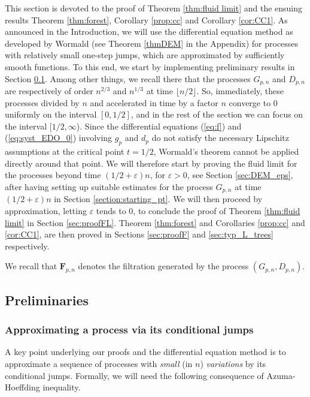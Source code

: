\documentclass[a4, 11pt]{article}
\numberwithin{equation}{section}
\theoremstyle{plain}
\theoremstyle{definition}
\theoremstyle{remark}
\begin{document}
This section is devoted to the proof of Theorem \ref{thm:fluid limit} and the ensuing results Theorem \ref{thm:forest}, Corollary \ref{prop:cc} and Corollary \ref{cor:CC1}. As announced in the Introduction, we will use the differential equation method as developed by Wormald (see Theorem \ref{thmDEM} in the Appendix) for processes with relatively small one-step jumps, which are approximated by sufficiently smooth functions. To this end, we start by implementing preliminary results in Section \ref{sec:prelimSection4}. Among other things, we recall there that the processes $G_{p,n}$ and $D_{p,n}$ are respectively of order $n^{2/3}$ and $n^{1/3}$ at time $\lfloor n/2 \rfloor$. So, immediately, these processes divided by $n$ and accelerated in time by a factor $n$ converge to 0 uniformly on the interval $[0,1/2]$, and in the rest of the section we can focus on the interval $[1/2,\infty$). Since the differential equations (\ref{eq:f}) and (\ref{eq:syst_EDO_0}) involving $g_p$ and $d_p$ do not satisfy the necessary Lipschitz assumptions at the critical point $t=1/2$, Wormald's theorem cannot be applied directly around that point. We will therefore start by proving the fluid limit for the processes beyond time $(1/2+\varepsilon)n$, for $\varepsilon>0$, see Section \ref{sec:DEM_eps}, after having setting up suitable estimates for the process $G_{p,n}$ at time $(1/2+\varepsilon)n$ in Section \ref{section:starting_pt}.  We will then proceed by approximation, letting $\varepsilon$ tends to $0$, to conclude the proof of Theorem \ref{thm:fluid limit} in Section \ref{sec:proofFL}. Theorem \ref{thm:forest} and Corollaries \ref{prop:cc} and \ref{cor:CC1}, are then proved in Sections \ref{sec:proofF} and \ref{sec:typ_L_trees} respectively.

We recall that $\mathbf{F}_{p,n}$ denotes the filtration generated by the process $(G_{p,n},D_{p,n})$.
	
	\subsection{Preliminaries}
	\label{sec:prelimSection4}
	
	\subsubsection{Approximating a process via its conditional jumps}
	
	A key point underlying our proofs and the differential equation method is to approximate a sequence of processes  with \emph{small} (in $n$) \emph{variations} by its conditional jumps. Formally, we will need the following consequence of Azuma-Hoeffding inequality.
	
\end{document}
